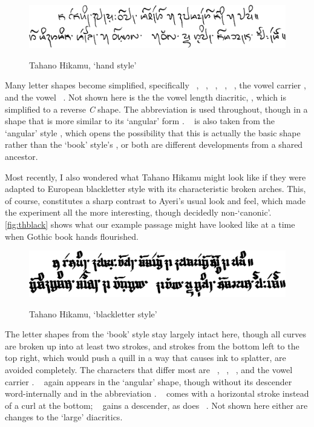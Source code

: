 \begin{figure}[ht]\centering
\caption{Tahano Hikamu, `hand style'}
\includegraphics[width=0.75\linewidth]{images/tahanohand-300dpi-bw.png}
\label{fig:thhand}
\end{figure}

Many letter shapes become simplified, specifically ~, 
~, ~, ~, ~, 
the vowel carrier , and the vowel ~. Not shown here is 
the the vowel length diacritic, , which is simplified to a reverse 
\textit{C} shape. The abbreviation  is used throughout, 
though in a shape that is more similar to its `angular' form \ayr{\itshape \&}. 
~ is also taken from the `angular' style , which 
opens the possibility that this is actually the basic shape rather than the 
`book' style's , or both are different developments from a shared 
ancestor.

Most recently, I also wondered what Tahano Hikamu might look like if they were 
adapted to European blackletter style with its characteristic broken arches. 
This, of course, constitutes a sharp contrast to Ayeri's usual look and feel, 
which made the experiment all the more interesting, though decidedly 
non-`canonic'. \autoref{fig:thblack} shows what our example passage might have 
looked like at a time when Gothic book hands flourished.

\begin{figure}[ht]\centering
\caption{Tahano Hikamu, `blackletter style'}
\includegraphics[width=0.75\linewidth]{images/tahanoblack-300dpi-bw.png}
\label{fig:thblack}
\end{figure}

The letter shapes from the `book' style stay largely intact here, though all 
curves are broken up into at least two strokes, and strokes from the bottom 
left to the top right, which would push a quill in a way that causes ink to 
splatter, are avoided completely. The characters that differ most are 
~, ~, ~, and the vowel 
carrier . ~ again appears in the `angular' shape, though 
without its descender word-internally and in the abbreviation . 
~ comes with a horizontal stroke instead of a curl at the 
bottom; ~ gains a descender, as does ~. Not 
shown here either are changes to the `large' diacritics.

